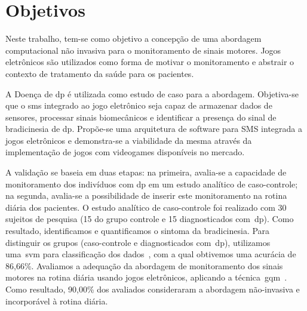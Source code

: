 \section{Objetivos}
Neste trabalho, tem-se como objetivo a concepção de uma abordagem computacional não invasiva para o monitoramento de sinais motores. Jogos eletrônicos são utilizados como forma de motivar o monitoramento e abstrair o contexto de tratamento da saúde para os pacientes.

A Doença de \ac{dp} é utilizada como estudo de caso para a abordagem. Objetiva-se que o \ac{sms} integrado ao jogo eletrônico seja capaz de armazenar dados de sensores, processar sinais biomecânicos e identificar a presença do sinal de bradicinesia de \ac{dp}. Propõe-se uma arquitetura de software para SMS integrada a jogos eletrônicos e demonstra-se a viabilidade da mesma através da implementação de jogos com videogames disponíveis no mercado. 

A validação se baseia em duas etapas: na primeira, avalia-se a capacidade de monitoramento dos indivíduos com \ac{dp} em um estudo analítico de caso-controle; na segunda, avalia-se a possibilidade de inserir este monitoramento na rotina diária dos pacientes. O estudo analítico de caso-controle foi realizado com 30 sujeitos de pesquisa (15 do grupo controle e 15 diagnosticados com~\ac{dp}). Como resultado, identificamos e quantificamos o sintoma da bradicinesia. Para distinguir os grupos (caso-controle e diagnosticados com~\ac{dp}), utilizamos uma~\ac{svm} para classificação dos dados~\cite{datamining2005}, com a qual obtivemos uma acurácia de 86,66\%. Avaliamos a adequação da abordagem de monitoramento dos sinais motores na rotina diária usando jogos eletrônicos, aplicando a técnica~\ac{gqm}~\cite{van1999goal}. Como resultado, 90,00\% dos avaliados consideraram a abordagem não-invasiva e incorporável à rotina diária. 

